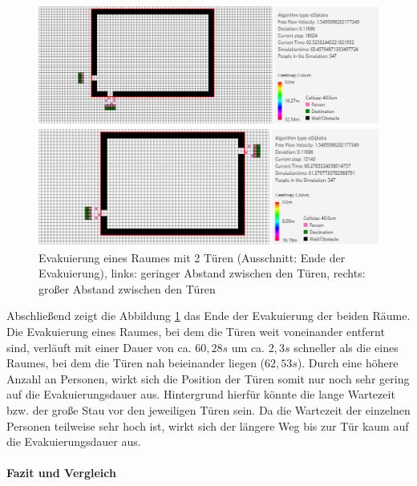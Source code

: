 \begin{figure}[!htb]
	\centering
	\begin{minipage}{.5\textwidth}
		\centering
		\includegraphics[width=\textwidth]{abbildungen/Evak2TMinDis2ENDE.png}
	\end{minipage}%
	\begin{minipage}{0.5\textwidth}
		\centering
		\includegraphics[width=\textwidth]{abbildungen/Evak2TMaxDis2ENDE.png}
	\end{minipage}
	\caption{Evakuierung eines Raumes mit 2 Türen (Ausschnitt: Ende der Evakuierung), links: geringer Abstand zwischen den Türen, rechts: großer Abstand zwischen den Türen}
	\label{fig:Evak2TminmaxDis2ENDE}
\end{figure}

Abschließend zeigt die Abbildung \ref{fig:Evak2TminmaxDis2ENDE} das Ende der Evakuierung der beiden Räume. Die Evakuierung eines Raumes, bei dem die Türen weit voneinander entfernt sind, verläuft mit einer Dauer von ca. $60,28s$ um ca. $2,3s$ schneller als die eines Raumes, bei dem die Türen nah beieinander liegen ($62,53s$). Durch eine höhere Anzahl an Personen, wirkt sich die Position der Türen somit nur noch sehr gering auf die Evakuierungsdauer aus. Hintergrund hierfür könnte die lange Wartezeit bzw. der große Stau vor den jeweiligen Türen sein. Da die Wartezeit der einzelnen Personen teilweise sehr hoch ist, wirkt sich der längere Weg bis zur Tür kaum auf die Evakuierungsdauer aus.
 
\paragraph{Fazit und Vergleich}



